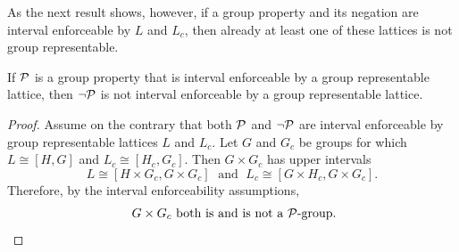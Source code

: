 \documentclass[xcolor=dvipsnames,11pt,hide notes]{beamer}
\theoremstyle{definition}
\theoremstyle{remark}
\numberwithin{theorem}{section}
\numberwithin{claim}{section}
\numberwithin{equation}{section}
\numberwithin{conjecture}{section}
\begin{document}
\begin{frame}[label=IEPropsLemma]{}
As the next result shows, however, if a group property and its
negation are interval enforceable by $L$ and $L_c$, then already
at least one of these lattices is not group representable.
\vskip5mm
\begin{lemma}
  If $\mathcal{P}$ is a group property that is interval enforceable by a group representable lattice,
  then $\neg \mathcal{P}$ is not interval enforceable by a group representable lattice.
\end{lemma}
\end{frame}

\begin{frame}[label=IEPropsLemmaProof]{}
\begin{proof}
Assume on the contrary that both $\mathcal{P}$ and $\neg \mathcal{P}$
are interval enforceable by group representable lattices $L$ and $L_c$. 
\vskip2mm
Let $G$ and $G_c$ be groups for which $L\cong [H,G]$ and $L_c\cong
[H_c,G_c]$.
\vskip2mm
Then $G\times G_c$ has upper intervals 
\[L\cong [H\times G_c, G\times G_c]\; \text{ and }\;
L_c\cong [G\times H_c, G\times G_c].\]  
Therefore, by the interval enforceability
assumptions, 
\[
\text{ $G\times G_c$ both is and is not a $\mathcal{P}$-group.}
\] 
\end{proof}
\end{frame}








\end{document}
